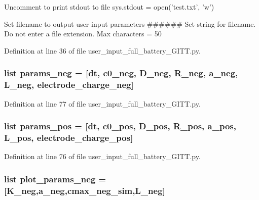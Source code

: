 Uncomment to print stdout to file sys.\-stdout = open('test.\-txt', 'w') 

Set filename to output user input parameters \#\#\#\#\#\# Set string for filename. Do not enter a file extension. Max characters = 50 

Definition at line 36 of file user\-\_\-input\-\_\-full\-\_\-battery\-\_\-\-G\-I\-T\-T.\-py.

\hypertarget{namespaceuser__input__full__battery___g_i_t_t_a0bd2f9c022b04c151ac8c0ad19eadd67}{
\subsubsection[{params\-\_\-neg}]{\setlength{\rightskip}{0pt plus 5cm}list params\-\_\-neg = \mbox{[}{\bf dt}, {\bf c0\-\_\-neg}, D\-\_\-neg, R\-\_\-neg, a\-\_\-neg, L\-\_\-neg, electrode\-\_\-charge\-\_\-neg\mbox{]}}}\label{namespaceuser__input__full__battery___g_i_t_t_a0bd2f9c022b04c151ac8c0ad19eadd67}


Definition at line 77 of file user\-\_\-input\-\_\-full\-\_\-battery\-\_\-\-G\-I\-T\-T.\-py.

\hypertarget{namespaceuser__input__full__battery___g_i_t_t_a51c49f845d3932a6a084187c90aab1ab}{
\subsubsection[{params\-\_\-pos}]{\setlength{\rightskip}{0pt plus 5cm}list params\-\_\-pos = \mbox{[}{\bf dt}, {\bf c0\-\_\-pos}, D\-\_\-pos, R\-\_\-pos, a\-\_\-pos, L\-\_\-pos, electrode\-\_\-charge\-\_\-pos\mbox{]}}}\label{namespaceuser__input__full__battery___g_i_t_t_a51c49f845d3932a6a084187c90aab1ab}


Definition at line 76 of file user\-\_\-input\-\_\-full\-\_\-battery\-\_\-\-G\-I\-T\-T.\-py.

\hypertarget{namespaceuser__input__full__battery___g_i_t_t_a0861e0e85d9d6139e0cc3cc1cc4fa692}{
\subsubsection[{plot\-\_\-params\-\_\-neg}]{\setlength{\rightskip}{0pt plus 5cm}list plot\-\_\-params\-\_\-neg = \mbox{[}{\bf K\-\_\-neg},a\-\_\-neg,{\bf cmax\-\_\-neg\-\_\-sim},L\-\_\-neg\mbox{]}}}\label{namespaceuser__input__full__battery___g_i_t_t_a0861e0e85d9d6139e0cc3cc1cc4fa692}


